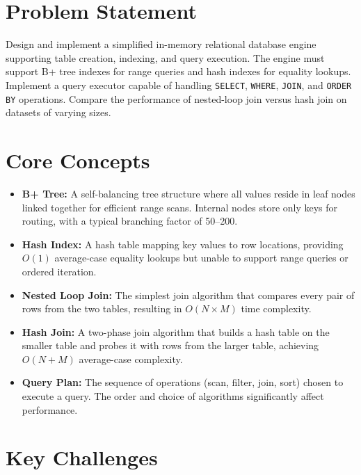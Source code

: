 \section{Problem Statement}

Design and implement a simplified in-memory relational database engine supporting table creation, indexing, and query execution. The engine must support B+ tree indexes for range queries and hash indexes for equality lookups. Implement a query executor capable of handling \texttt{SELECT}, \texttt{WHERE}, \texttt{JOIN}, and \texttt{ORDER BY} operations. Compare the performance of nested-loop join versus hash join on datasets of varying sizes.

\section{Core Concepts}

\begin{itemize}
  \item \textbf{B+ Tree:} A self-balancing tree structure where all values reside in leaf nodes linked together for efficient range scans. Internal nodes store only keys for routing, with a typical branching factor of 50--200.
  \item \textbf{Hash Index:} A hash table mapping key values to row locations, providing $O(1)$ average-case equality lookups but unable to support range queries or ordered iteration.
  \item \textbf{Nested Loop Join:} The simplest join algorithm that compares every pair of rows from the two tables, resulting in $O(N \times M)$ time complexity.
  \item \textbf{Hash Join:} A two-phase join algorithm that builds a hash table on the smaller table and probes it with rows from the larger table, achieving $O(N + M)$ average-case complexity.
  \item \textbf{Query Plan:} The sequence of operations (scan, filter, join, sort) chosen to execute a query. The order and choice of algorithms significantly affect performance.
\end{itemize}

\section{Key Challenges}

